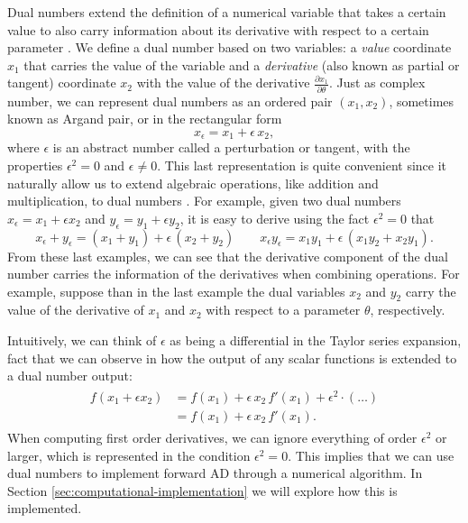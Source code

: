 Dual numbers extend the definition of a numerical variable that takes a certain value to also carry information about its derivative with respect to a certain parameter \cite{clifford1871dualnumbers}. 
We define a dual number based on two variables: a \textit{value} coordinate $x_1$ that carries the value of the variable and a \textit{derivative} (also known as partial or tangent) coordinate $x_2$ with the value of the derivative $\frac{\partial x_1}{\partial \theta}$. 
Just as complex number, we can represent dual numbers as an ordered pair $(x_1, x_2)$, sometimes known as Argand pair, or in the rectangular form 
\begin{equation}
 x_\epsilon = x_1 + \epsilon \, x_2,
\end{equation}
where $\epsilon$ is an abstract number called a perturbation or tangent, with the properties $\epsilon^2 = 0$ and $\epsilon \neq 0$.
This last representation is quite convenient since it naturally allow us to extend algebraic operations, like addition and multiplication, to dual numbers \cite{Karczmarczuk2001}. 
For example, given two dual numbers $x_\epsilon = x_1 + \epsilon x_2$ and $y_\epsilon = y_1 + \epsilon y_2$, it is easy to derive using the fact $\epsilon^2=0$ that
\begin{equation}
 x_\epsilon + y_\epsilon = (x_1 + y_1) + \epsilon \, (x_2 + y_2)
 \qquad
 x_\epsilon y_\epsilon = x_1 y_1 + \epsilon \, (x_1 y_2 + x_2 y_1) .
\end{equation}
From these last examples, we can see that the derivative component of the dual number carries the information of the derivatives when combining operations.
For example, suppose than in the last example the dual variables $x_2$ and $y_2$ carry the value of the derivative of $x_1$ and $x_2$ with respect to a parameter $\theta$, respectively. 

Intuitively, we can think of $\epsilon$ as being a differential in the Taylor series expansion, fact that we can observe in how the output of any scalar functions is extended to a dual number output:
\begin{align}
\begin{split}
    f(x_1 + \epsilon x_2)
    &= 
    f(x_1)
    + 
    \epsilon \, x_2 \,  f'(x_1)
    + 
    \epsilon^2 \cdot ( \ldots )\\
    &= 
    f(x_1)
    + 
    \epsilon \, x_2 \,  f'(x_1).
\end{split}
\label{eq:dual-number-function}
\end{align}
When computing first order derivatives, we can ignore everything of order $\epsilon^2$ or larger, which is represented in the condition $\epsilon^2 = 0$.
This implies that we can use dual numbers to implement forward AD through a numerical algorithm. 
In Section \ref{sec:computational-implementation} we will explore how this is implemented. 

